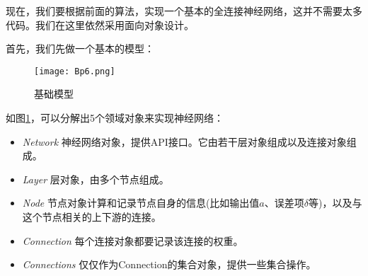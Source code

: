 现在，我们要根据前面的算法，实现一个基本的全连接神经网络，这并不需要太多代码。我们在这里依然采用面向对象设计。

首先，我们先做一个基本的模型：

\begin{figure}[htbp]
	\centering
	\texttt{[image: Bp6.png]}
	\caption{基础模型}
	\label{fig:Bp6}
\end{figure}
如图\ref{fig:Bp6}，可以分解出5个领域对象来实现神经网络：
\begin{itemize}
	\item
	      \emph{Network}
	      神经网络对象，提供API接口。它由若干层对象组成以及连接对象组成。
	\item
	      \emph{Layer} 层对象，由多个节点组成。
	\item
	      \emph{Node} 节点对象计算和记录节点自身的信息(比如输出值\(a\)、误差项\(\delta\)等)，以及与这个节点相关的上下游的连接。
	\item
	      \emph{Connection} 每个连接对象都要记录该连接的权重。
	\item
	      \emph{Connections} 仅仅作为Connection的集合对象，提供一些集合操作。
\end{itemize}

